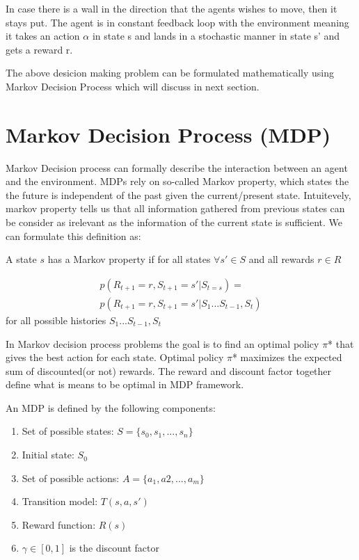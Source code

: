 \documentclass[10pt,a4paper,twocolumn]{article}
\begin{document}
	

	In case there is a wall in the direction that the agents wishes to move, then it stays put.
	The agent is in constant feedback loop with the environment meaning it takes an action $\alpha$ in state s and lands in a stochastic manner in state s’ and gets a reward r.
	
	The above desicion making problem can be formulated mathematically using Markov Decision Process which will discuss in next section.
	
	\section{Markov Decision Process (MDP)}
	
	Markov Decision process can formally describe the interaction between an agent and the environment. MDPs rely on so-called Markov property, which states the the future is independent of the past given the current/present state. Intuitevely, markov property tells us that all information gathered from previous states can be consider as irelevant as the information of the current state is sufficient. We can formulate this definition as:
	
	A state $s$ has a Markov property if for all states $\forall{s'} \in S$ and all rewards $r \in R$
	
	\begin{equation}
		\begin{split}
			p(R_{t+1} = r , S_{t+1}=s' | S_{t=s}) = \\ 
		 	p(R_{t+1} = r , S_{t+1}=s' | S_{1} ... S_{t-1}, S_{t})
		\end{split}
	\end{equation}
	for all possible histories $ S_{1} ... S_{t-1}, S_{t} $
	
	In Markov decision process problems the goal is to find an optimal policy $\pi$* that gives  the best action for each state. Optimal policy $\pi$* maximizes the expected sum of discounted(or not) rewards. The reward and discount factor together define what is means to be optimal in MDP framework.
	
	An MDP is defined by the following components:
	\begin{enumerate}
		\item Set of possible states: $S = \{ s_{0}, s_{1}, ..., s_{n} \}$
		\item Initial state: $S_{0}$
		\item Set of possible actions: $A = \{ a_{1}, a{2}, ..., a_{m} \}$
		\item Transition model: $T(s, a, s')$
		\item Reward function: $R(s)$
		\item $\gamma \in [0,1] $ is the discount factor
	\end{enumerate}
\end{document}

